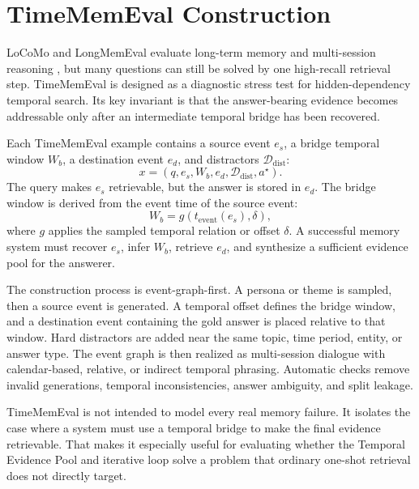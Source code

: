 \section{TimeMemEval Construction}
\label{sec:methods-timememeval}

LoCoMo and LongMemEval evaluate long-term memory and multi-session reasoning
\cite{maharana2024locomo,wu2024longmemeval}, but many questions can still be
solved by one high-recall retrieval step. TimeMemEval is designed as a
diagnostic stress test for hidden-dependency temporal search. Its key invariant
is that the answer-bearing evidence becomes addressable only after an
intermediate temporal bridge has been recovered.

Each TimeMemEval example contains a source event $e_s$, a bridge temporal window
$W_b$, a destination event $e_d$, and distractors $\mathcal{D}_{\mathrm{dist}}$:
\[
  x=(q,e_s,W_b,e_d,\mathcal{D}_{\mathrm{dist}},a^\star).
\]
The query makes $e_s$ retrievable, but the answer is stored in $e_d$. The bridge
window is derived from the event time of the source event:
\[
  W_b=g(t_{\mathrm{event}}(e_s),\delta),
\]
where $g$ applies the sampled temporal relation or offset $\delta$. A successful
memory system must recover $e_s$, infer $W_b$, retrieve $e_d$, and synthesize a
sufficient evidence pool for the answerer.

The construction process is event-graph-first. A persona or theme is sampled,
then a source event is generated. A temporal offset defines the bridge window,
and a destination event containing the gold answer is placed relative to that
window. Hard distractors are added near the same topic, time period, entity, or
answer type. The event graph is then realized as multi-session dialogue with
calendar-based, relative, or indirect temporal phrasing. Automatic checks remove
invalid generations, temporal inconsistencies, answer ambiguity, and split
leakage.

TimeMemEval is not intended to model every real memory failure. It isolates the
case where a system must use a temporal bridge to make the final evidence
retrievable. That makes it especially useful for evaluating whether the
Temporal Evidence Pool and iterative loop solve a problem that ordinary
one-shot retrieval does not directly target.
